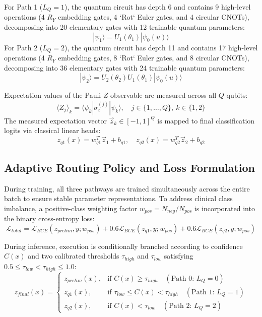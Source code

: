 \documentclass[conference]{IEEEtran}
\begin{document}
For Path 1 ($L_Q=1$), the quantum circuit has depth 6 and contains 9 high-level operations (4 $R_Y$ embedding gates, 4 `Rot` Euler gates, and 4 circular CNOTs), decomposing into 20 elementary gates with 12 trainable quantum parameters:
\begin{equation}
|\psi_1\rangle = U_1(\theta_1) |\psi_0(u)\rangle
\end{equation}
For Path 2 ($L_Q=2$), the quantum circuit has depth 11 and contains 17 high-level operations (4 $R_Y$ embedding gates, 8 `Rot` Euler gates, and 8 circular CNOTs), decomposing into 36 elementary gates with 24 trainable quantum parameters:
\begin{equation}
|\psi_2\rangle = U_2(\theta_2) U_1(\theta_1) |\psi_0(u)\rangle
\end{equation}

Expectation values of the Pauli-$Z$ observable are measured across all $Q$ qubits:
\begin{equation}
\langle Z_j \rangle_k = \langle \psi_k | \sigma_z^{(j)} | \psi_k \rangle, \quad j \in \{1, \dots, Q\}, \ k \in \{1, 2\}
\end{equation}
The measured expectation vector $\vec{z}_k \in [-1, 1]^Q$ is mapped to final classification logits via classical linear heads:
\begin{equation}
z_{q1}(x) = w_{q1}^T \vec{z}_1 + b_{q1}, \quad z_{q2}(x) = w_{q2}^T \vec{z}_2 + b_{q2}
\end{equation}

\subsection{Adaptive Routing Policy and Loss Formulation}
During training, all three pathways are trained simultaneously across the entire batch to ensure stable parameter representations. To address clinical class imbalance, a positive-class weighting factor $w_{pos} = N_{neg} / N_{pos}$ is incorporated into the binary cross-entropy loss:
\begin{equation}
\mathcal{L}_{total} = \mathcal{L}_{BCE}(z_{prelim}, y; w_{pos}) + 0.6 \mathcal{L}_{BCE}(z_{q1}, y; w_{pos}) + 0.6 \mathcal{L}_{BCE}(z_{q2}, y; w_{pos})
\end{equation}

During inference, execution is conditionally branched according to confidence $C(x)$ and two calibrated thresholds $\tau_{high}$ and $\tau_{low}$ satisfying $0.5 \le \tau_{low} < \tau_{high} \le 1.0$:
\begin{equation}
z_{final}(x) = \begin{cases}
z_{prelim}(x), & \text{if } C(x) \ge \tau_{high} \quad (\text{Path 0: } L_Q=0) \\
z_{q1}(x), & \text{if } \tau_{low} \le C(x) < \tau_{high} \quad (\text{Path 1: } L_Q=1) \\
z_{q2}(x), & \text{if } C(x) < \tau_{low} \quad (\text{Path 2: } L_Q=2)
\end{cases}
\end{equation}
\end{document}
